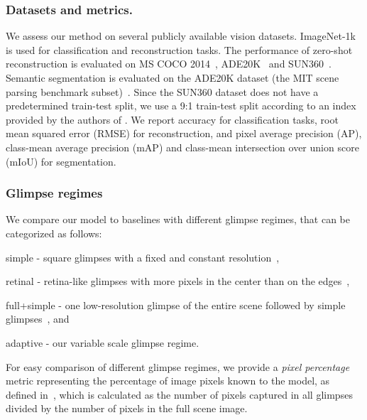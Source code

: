 \documentclass[runningheads]{llncs}
\begin{document}


\subsubsection{Datasets and metrics.}
We assess our method on several publicly available vision datasets. ImageNet-1k~\cite{deng2009imagenet} is used for classification and reconstruction tasks. The performance of zero-shot reconstruction is evaluated on MS COCO 2014~\cite{lin2014microsoft}, ADE20K~\cite{zhou2017scene} and SUN360~\cite{song2015sun}. Semantic segmentation is evaluated on the ADE20K dataset (the MIT scene parsing benchmark subset)~\cite{zhou2017scene}. Since the SUN360 dataset does not have a predetermined train-test split, we use a 9:1 train-test split according to an index provided by the authors of \cite{seifi2021glimpse}. We report accuracy for classification tasks, root mean squared error (RMSE) for reconstruction, and pixel average precision (AP), class-mean average precision (mAP) and class-mean intersection over union score (mIoU) for segmentation.

\subsubsection{Glimpse regimes} \label{sec:glimpseregimes} We compare our model to baselines with different glimpse regimes, that can be categorized as follows: \begin{enumerate*}[label=(\alph*)]
    \item simple - square glimpses with a fixed and constant resolution~\cite{rangrej2022consistency, pardyl2023active, jha2023simglim},
    \item retinal - retina-like glimpses\cite{sandini2003retina} with more pixels in the center than on the edges~\cite{seifi2020attend, seifi2021glimpse, pardyl2023active},
    \item full+simple - one low-resolution glimpse of the entire scene followed by simple glimpses~\cite{ba2015multiple,wang2020glance,elsayed2019saccader,uzkent2020learning,recasens2018learning,papadopoulos2021hard}, and
    \item adaptive - our variable scale glimpse regime.
\end{enumerate*}

For easy comparison of different glimpse regimes, we provide a \textit{pixel percentage} metric representing the percentage of image pixels known to the model, as defined in~\cite{pardyl2023active}, which is calculated as the number of pixels captured in all glimpses divided by the number of pixels in the full scene image.
\end{document}
